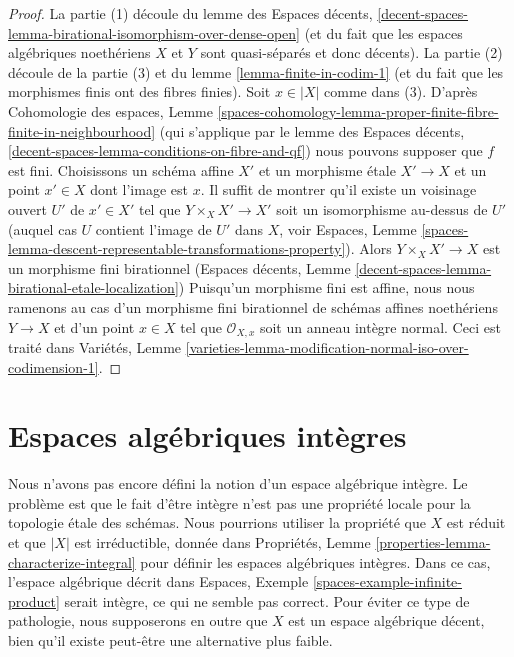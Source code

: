 \begin{proof}
La partie (1) découle du lemme des Espaces décents,
\ref{decent-spaces-lemma-birational-isomorphism-over-dense-open}
(et du fait que les espaces algébriques noethériens $X$ et $Y$
sont quasi-séparés et donc décents).
La partie (2) découle de la partie (3) et du lemme \ref{lemma-finite-in-codim-1}
(et du fait que les morphismes finis ont des fibres finies).
Soit $x \in |X|$ comme dans (3). D'après
Cohomologie des espaces, Lemme
\ref{spaces-cohomology-lemma-proper-finite-fibre-finite-in-neighbourhood}
(qui s'applique par le lemme des Espaces décents,
\ref{decent-spaces-lemma-conditions-on-fibre-and-qf})
nous pouvons supposer que $f$ est fini. Choisissons un schéma affine $X'$ et
un morphisme \'etale $X' \to X$ et un point $x' \in X$ dont l'image est $x$.
Il suffit de montrer qu'il existe un voisinage ouvert $U'$ de $x' \in X'$
tel que $Y \times_X X' \to X'$ soit un isomorphisme au-dessus de $U'$
(auquel cas $U$ contient l'image de $U'$ dans $X$, voir Espaces, Lemme
\ref{spaces-lemma-descent-representable-transformations-property}).
Alors $Y \times_X X' \to X$ est un morphisme fini birationnel
(Espaces décents, Lemme \ref{decent-spaces-lemma-birational-etale-localization})
Puisqu'un morphisme fini est affine, nous nous ramenons
au cas d'un morphisme fini birationnel de schémas affines noethériens
$Y \to X$ et d'un point $x \in X$ tel que $\mathcal{O}_{X, x}$ soit un
anneau intègre normal. Ceci est traité dans Variétés, Lemme
\ref{varieties-lemma-modification-normal-iso-over-codimension-1}.
\end{proof}






\section{Espaces algébriques intègres}
\label{section-integral-spaces}

\noindent
Nous n'avons pas encore défini la notion d'un espace algébrique intègre. Le
problème est que le fait d'être intègre n'est pas une propriété locale pour la topologie \'etale des schémas.
Nous pourrions utiliser la propriété que $X$ est réduit et que $|X|$ est irréductible,
donnée dans Propriétés, Lemme \ref{properties-lemma-characterize-integral}
pour définir les espaces algébriques intègres. Dans ce cas, l'espace algébrique
décrit dans Espaces, Exemple \ref{spaces-example-infinite-product}
serait intègre, ce qui ne semble pas correct.
Pour éviter ce type de pathologie, nous supposerons en outre que $X$ est
un espace algébrique décent, bien qu'il existe peut-être une alternative plus faible.

